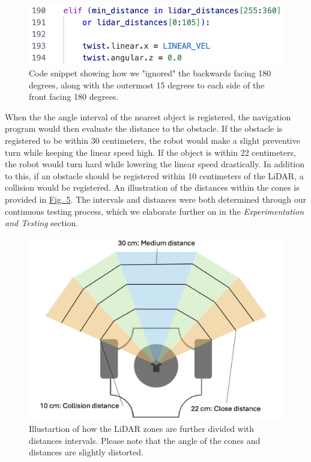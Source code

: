 \documentclass[conference]{IEEEtran}
\begin{document}
\begin{figure}[htbp]
    \centerline{\includegraphics[width=1.0\columnwidth\hspace{0.0cm}]{Pictures/ignore.png}}
    \caption{Code snippet showing how we "ignored" the backwards facing 180 degrees, along with the outermost 15 degrees to each side of the front facing 180 degrees.}
    \label{sec:ignore}
    \end{figure}

When the the angle interval of the nearest object is registered, the navigation program would then evaluate the distance to the obstacle.
If the obstacle is registered to be within 30 centimeters, the robot would make a slight preventive turn while keeping the linear speed high.
If the object is within 22 centimeters, the robot would turn hard while lowering the linear speed drastically.
In addition to this, if an obstacle should be registered within 10 centimeters of the LiDAR, a collision would be registered.
An illustration of the distances within the cones is provided in \href{sec:distances}{Fig. 5}.
The intervals and distances were both determined through our continuous testing process, which we elaborate further on in the \textit{Experimentation and Testing} section.
\begin{figure}[htbp]
    \centerline{\includegraphics[width=1.0\columnwidth]{Pictures/LiDAR Distances.png}}
    \caption{Illustartion of how the LiDAR zones are further divided with distances intervals. 
    Please note that the angle of the cones and distances are slightly distorted.}
    \label{sec:distances}
    \end{figure}
\end{document}
